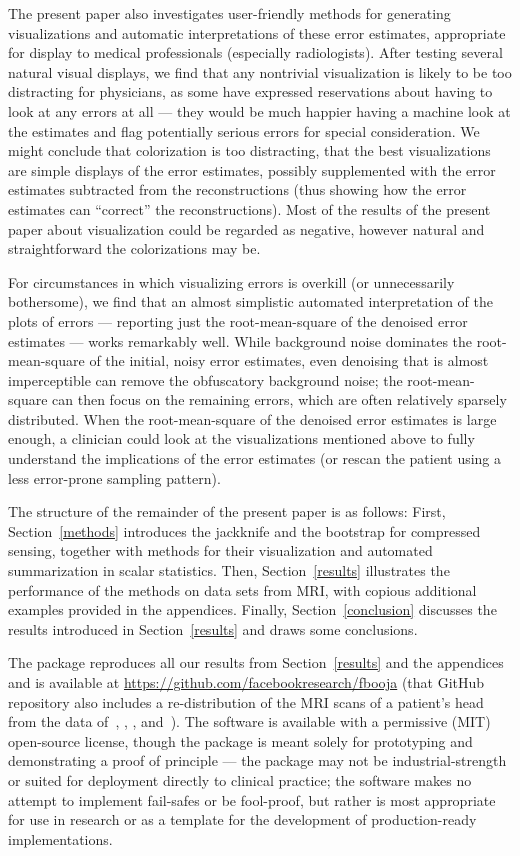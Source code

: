 \documentclass[article]{jdssv}
\begin{document}
The present paper also investigates user-friendly methods
for generating visualizations and automatic interpretations
of these error estimates,
appropriate for display to medical professionals (especially radiologists).
After testing several natural visual displays,
we find that any nontrivial visualization is likely to be too distracting
for physicians, as some have expressed reservations about having to look
at any errors at all --- they would be much happier having a machine look
at the estimates and flag potentially serious errors for special consideration.
We might conclude that colorization is too distracting,
that the best visualizations are simple displays of the error estimates,
possibly supplemented with the error estimates
subtracted from the reconstructions (thus showing how the error estimates
can ``correct'' the reconstructions).
Most of the results of the present paper about visualization could be regarded
as negative, however natural and straightforward the colorizations may be.

For circumstances in which visualizing errors is overkill
(or unnecessarily bothersome),
we find that an almost simplistic automated interpretation
of the plots of errors --- reporting just the root-mean-square
of the denoised error estimates --- works remarkably well.
While background noise dominates the root-mean-square
of the initial, noisy error estimates,
even denoising that is almost imperceptible
can remove the obfuscatory background noise;
the root-mean-square can then focus on the remaining errors,
which are often relatively sparsely distributed.
When the root-mean-square of the denoised error estimates is large enough,
a clinician could look at the visualizations mentioned above
to fully understand the implications of the error estimates
(or rescan the patient using a less error-prone sampling pattern).

The structure of the remainder of the present paper is as follows:
First, Section~\ref{methods} introduces the jackknife and the bootstrap
for compressed sensing, together with methods for their visualization
and automated summarization in scalar statistics.
Then, Section~\ref{results} illustrates the performance of the methods
on data sets from MRI, with copious additional examples provided
in the appendices.
Finally, Section~\ref{conclusion} discusses the results introduced
in Section~\ref{results} and draws some conclusions.

The  package  reproduces all our results
from Section~\ref{results} and the appendices and is available at
\url{https://github.com/facebookresearch/fbooja}
(that GitHub repository also includes a re-distribution
of the MRI scans of a patient's head from the data
of~\citet{mri2}, \citet{mri1}, \citet{mri3}, and~\citet{mri4}).
The software is available with a permissive (MIT) open-source license,
though the package is meant solely for prototyping and demonstrating
a proof of principle --- the package may not be industrial-strength
or suited for deployment directly to clinical practice; the software makes
no attempt to implement fail-safes or be fool-proof,
but rather is most appropriate for use in research or as a template
for the development of production-ready implementations.
\end{document}
